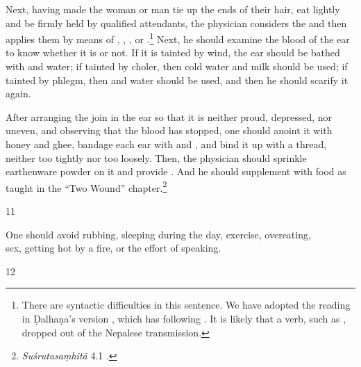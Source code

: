 \begin{translation}
Next, having made the woman or man tie up the ends of their hair, eat lightly and
be firmly held by qualified attendants, the physician considers the
 and then applies them by means of 
,
, , or
.\footnote{There are syntactic difficulties in this
    sentence.  We have %
    adopted the reading in Ḍalhaṇa's version \citep[78]{vulgate}, which has
     following . It is likely that a verb, such
    as , dropped out of the Nepalese transmission.}  Next, he should
    examine the blood of the ear to know whether it is  or not.
    If it is tainted by wind, the ear should be bathed with
     and water; if tainted by choler, then
    cold water and milk should be used; if tainted by phlegm, then
     and water should be used, and then he 
    should
    scarify it again.
       
After arranging the join in the ear so that it is neither proud, depressed, nor
uneven, and observing that the blood has stopped, one should anoint it with
honey and ghee, bandage each ear with  and 
, and
bind it up with a thread, neither too tightly nor too loosely.  Then, the
physician should sprinkle earthenware powder on it and  provide
. And he should supplement with food as taught in  the
“Two Wound” chapter.\footnote{\emph{Suśrutasaṃhitā} 4.1 \citep[396–408]{vulgate}.}
    
\item[11]
\begin{sloka}
        One should avoid rubbing, sleeping during the day, exercise, overeating,\\
        sex, getting hot by a fire, or the effort of speaking.
    \end{sloka}

\item[12]
    

\end{translation}
